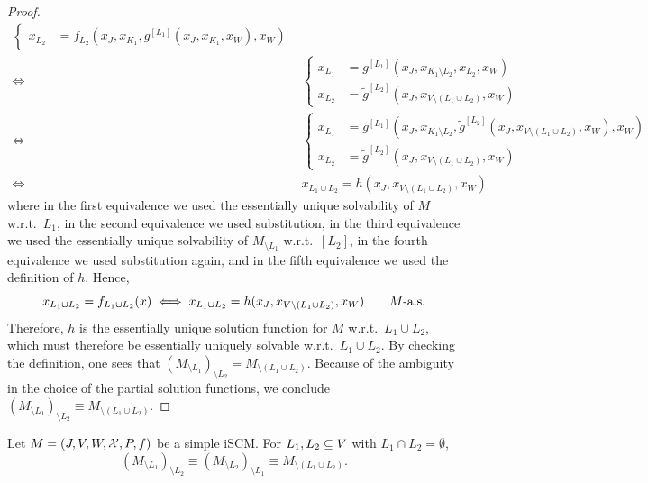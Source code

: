 \begin{proof}
\begin{equation*}
\begin{split}
\begin{cases}
      x_{L_2} &= f_{L_2}(x_J,x_{K_1},g^{[L_1]}(x_J,x_{K_1},x_W),x_W) 
    \end{cases} \\
    \iff &
    \begin{cases}
      x_{L_1} &= g^{[L_1]}(x_J,x_{K_1\setminus L_2},x_{L_2},x_W) \\
      x_{L_2} &= \tilde{g}^{[L_2]}(x_J,x_{V\setminus(L_1 \cup L_2)},x_W)
    \end{cases} \\
    \iff &
    \begin{cases}
      x_{L_1} &= g^{[L_1]}(x_J,x_{K_1\setminus L_2},\tilde{g}^{[L_2]}(x_J,x_{V\setminus(L_1 \cup L_2)},x_W),x_W) \\
      x_{L_2} &= \tilde{g}^{[L_2]}(x_J,x_{V\setminus(L_1 \cup L_2)},x_W)
    \end{cases} \\
    \iff &
      x_{L_1\cup L_2} = h(x_J,x_{V\setminus(L_1\cup L_2)},x_W) 
  \end{split}\end{equation*}
  where in the first equivalence we used the essentially unique solvability of $M$ w.r.t.\ $L_1$, 
  in the second equivalence we used substitution, 
  in the third equivalence we used the essentially unique solvability of $M_{\setminus L_1}$ w.r.t.\ $[L_2]$, 
  in the fourth equivalence we used substitution again, 
  and in the fifth equivalence we used the definition of $h$.
  Hence,
    $$x_{L_1 \cup L_2} = f_{L_1 \cup L_2}(x) \iff x_{L_1\cup L_2} = h(x_J,x_{V\setminus(L_1\cup L_2)},x_W) \qquad M\text{-a.s.}$$
  Therefore, $h$ is the essentially unique solution function for $M$ w.r.t.\ $L_1\cup L_2$, which must therefore be essentially uniquely solvable w.r.t.\ $L_1 \cup L_2$. 
  By checking the definition, one sees that $(M_{\setminus L_1})_{\setminus L_2} = M_{\setminus(L_1 \cup L_2)}$.
  Because of the ambiguity in the choice of the partial solution functions, we conclude $(M_{\setminus L_1})_{\setminus L_2} \equiv M_{\setminus(L_1 \cup L_2)}$.
\end{proof}
\begin{Cor}\label{cor:marginalization_commutes_simple_scm}
  Let $M = \left ( J, V, W, \mathcal{X}, P, f \right )$ be a simple iSCM.
  For $L_1, L_2 \subseteq V$ with $L_1 \cap L_2 = \emptyset$,
    $$(M_{\setminus L_1})_{\setminus L_2} \equiv (M_{\setminus L_2})_{\setminus L_1} \equiv M_{\setminus (L_1 \cup L_2)}.$$
\end{Cor}

